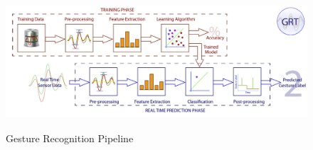 \begin{figure}
	[h] \centering 
	\includegraphics[height=5cm]{figures/content/grt-pipeline.png} \caption{Gesture Recognition Pipeline} \label{fg:grt:pipeline} 
\end{figure}
